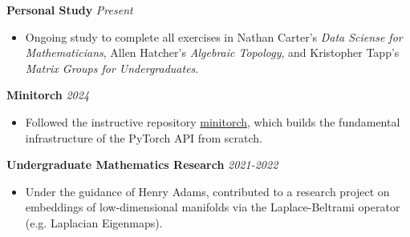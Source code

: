 \documentclass[a4paper,10pt]{article}
\newcommand{\resumeEntry}[2]{%
  \noindent\textbf{#1} \hfill \textit{#2}\par\vspace{-0.5ex}%
}
\begin{document}
\resumeEntry{Personal Study}{Present}
\begin{itemize}[leftmargin=*, noitemsep]
    \item Ongoing study to complete all exercises in Nathan Carter's \textit{Data Sciense for Mathematicians},
    Allen Hatcher's \textit{Algebraic Topology}, and Kristopher Tapp's \textit{Matrix Groups for Undergraduates}.
\end{itemize}

\resumeEntry{Minitorch}{2024}
\begin{itemize}[leftmargin=*, noitemsep]
    \item Followed the instructive repository \href{https://minitorch.github.io/}{minitorch}, which builds the 
    fundamental infrastructure of the PyTorch API from scratch.
\end{itemize}

\resumeEntry{Undergraduate Mathematics Research}{2021-2022}
\begin{itemize}[leftmargin=*, noitemsep]
    \item Under the guidance of Henry Adams, contributed to a research project on embeddings of low-dimensional manifolds 
    via the Laplace-Beltrami operator (e.g. Laplacian Eigenmaps).
\end{itemize}
\end{document}
